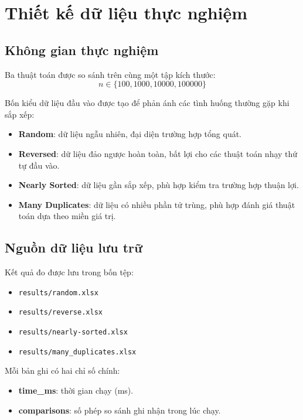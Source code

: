 \section{Thiết kế dữ liệu thực nghiệm}

\subsection{Không gian thực nghiệm}

Ba thuật toán được so sánh trên cùng một tập kích thước:
\[
    n \in \{100, 1000, 10000, 100000\}
\]

Bốn kiểu dữ liệu đầu vào được tạo để phản ánh các tình huống thường gặp khi sắp xếp:
\begin{itemize}[leftmargin=1.2cm]
    \item \textbf{Random}: dữ liệu ngẫu nhiên, đại diện trường hợp tổng quát.
    \item \textbf{Reversed}: dữ liệu đảo ngược hoàn toàn, bất lợi cho các thuật toán nhạy thứ tự đầu vào.
    \item \textbf{Nearly Sorted}: dữ liệu gần sắp xếp, phù hợp kiểm tra trường hợp thuận lợi.
    \item \textbf{Many Duplicates}: dữ liệu có nhiều phần tử trùng, phù hợp đánh giá thuật toán dựa theo miền giá trị.
\end{itemize}

\subsection{Nguồn dữ liệu lưu trữ}

Kết quả đo được lưu trong bốn tệp:
\begin{itemize}[leftmargin=1.2cm]
    \item \texttt{results/random.xlsx}
    \item \texttt{results/reverse.xlsx}
    \item \texttt{results/nearly-sorted.xlsx}
    \item \texttt{results/many\_duplicates.xlsx}
\end{itemize}

Mỗi bản ghi có hai chỉ số chính:
\begin{itemize}[leftmargin=1.2cm]
    \item \textbf{time\_ms}: thời gian chạy (ms).
    \item \textbf{comparisons}: số phép so sánh ghi nhận trong lúc chạy.
\end{itemize}

